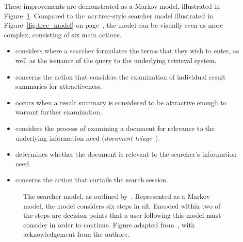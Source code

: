 These improvements are demonstrated as a Markov model, illustrated in Figure~\ref{fig:baskaya_model}. Compared to the~\gls{acr:trec}-style searcher model illustrated in Figure~\ref{fig:trec_model} on page~\pageref{fig:trec_model}, the model can be visually seen as more complex, consisting of six main actions.

\begin{itemize}
    \item{ considers where a searcher formulates the terms that they wish to enter, as well as the issuance of the query to the underlying retrieval system.}
    \item{ concerns the action that considers the examination of individual result summaries for attractiveness.}
    \item{ occurs when a result summary is considered to be attractive enough to warrant further examination.}
    \item{ considers the process of examining a document for relevance to the underlying information need (\emph{document triage}~\citep{marshall1997triage}).}
    \item{ determines whether the document is relevant to the searcher's information need.}
    \item{ concerns the action that curtails the search session.}
\end{itemize}

\begin{figure}[t!]
    \centering
    \caption[Markov model of the search process by~\cite{baskaya2013behavioural_factors}]{The searcher model, as outlined by~\cite{baskaya2013behavioural_factors}. Represented as a Markov model, the model considers six steps in all. Encoded within two of the steps are decision points that a user following this model must consider in order to continue. Figure adapted from~\cite{baskaya2013behavioural_factors}, with acknowledgement from the authors.}
    \label{fig:baskaya_model}
\end{figure}

